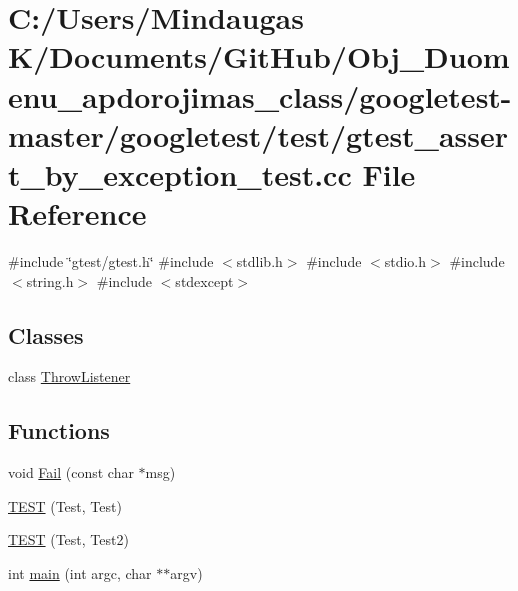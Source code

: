 \hypertarget{googletest-master_2googletest_2test_2gtest__assert__by__exception__test_8cc}{}\section{C\+:/\+Users/\+Mindaugas K/\+Documents/\+Git\+Hub/\+Obj\+\_\+\+Duomenu\+\_\+apdorojimas\+\_\+class/googletest-\/master/googletest/test/gtest\+\_\+assert\+\_\+by\+\_\+exception\+\_\+test.cc File Reference}
\label{googletest-master_2googletest_2test_2gtest__assert__by__exception__test_8cc}
{\ttfamily \#include \char`\"{}gtest/gtest.\+h\char`\"{}}\newline
{\ttfamily \#include $<$stdlib.\+h$>$}\newline
{\ttfamily \#include $<$stdio.\+h$>$}\newline
{\ttfamily \#include $<$string.\+h$>$}\newline
{\ttfamily \#include $<$stdexcept$>$}\newline
\subsection*{Classes}
\begin{DoxyCompactItemize}
\item 
class \mbox{\hyperlink{class_throw_listener}{Throw\+Listener}}
\end{DoxyCompactItemize}
\subsection*{Functions}
\begin{DoxyCompactItemize}
\item 
void \mbox{\hyperlink{googletest-master_2googletest_2test_2gtest__assert__by__exception__test_8cc_a78ecbe7682643ac0413d57d0b9f27fa6}{Fail}} (const char $\ast$msg)
\item 
\mbox{\hyperlink{googletest-master_2googletest_2test_2gtest__assert__by__exception__test_8cc_abd54dc4a1b6e0bcd993f8acfabe13400}{T\+E\+ST}} (Test, Test)
\item 
\mbox{\hyperlink{googletest-master_2googletest_2test_2gtest__assert__by__exception__test_8cc_a5a30210f18c6e07037bb61edc36ffc6c}{T\+E\+ST}} (Test, Test2)
\item 
int \mbox{\hyperlink{googletest-master_2googletest_2test_2gtest__assert__by__exception__test_8cc_a3c04138a5bfe5d72780bb7e82a18e627}{main}} (int argc, char $\ast$$\ast$argv)
\end{DoxyCompactItemize}
